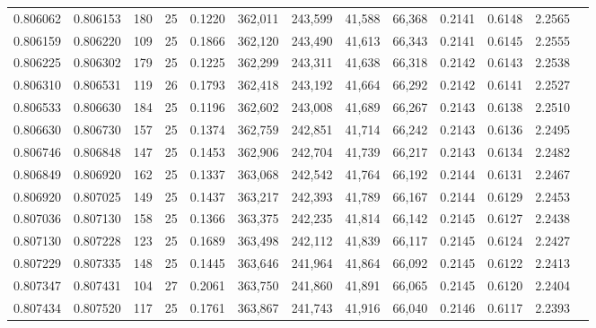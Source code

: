 \begin{tabular}{rrrrrrrrrrrrr}
0.806062 & 0.806153 &   180 &  25 &                                     0.1220 & 362,011 & 243,599 &  41,588 &  66,368 & 0.2141 & 0.6148 & 2.2565 \\
0.806159 & 0.806220 &   109 &  25 &                                     0.1866 & 362,120 & 243,490 &  41,613 &  66,343 & 0.2141 & 0.6145 & 2.2555 \\
0.806225 & 0.806302 &   179 &  25 &                                     0.1225 & 362,299 & 243,311 &  41,638 &  66,318 & 0.2142 & 0.6143 & 2.2538 \\
0.806310 & 0.806531 &   119 &  26 &                                     0.1793 & 362,418 & 243,192 &  41,664 &  66,292 & 0.2142 & 0.6141 & 2.2527 \\
0.806533 & 0.806630 &   184 &  25 &                                     0.1196 & 362,602 & 243,008 &  41,689 &  66,267 & 0.2143 & 0.6138 & 2.2510 \\
0.806630 & 0.806730 &   157 &  25 &                                     0.1374 & 362,759 & 242,851 &  41,714 &  66,242 & 0.2143 & 0.6136 & 2.2495 \\
0.806746 & 0.806848 &   147 &  25 &                                     0.1453 & 362,906 & 242,704 &  41,739 &  66,217 & 0.2143 & 0.6134 & 2.2482 \\
0.806849 & 0.806920 &   162 &  25 &                                     0.1337 & 363,068 & 242,542 &  41,764 &  66,192 & 0.2144 & 0.6131 & 2.2467 \\
0.806920 & 0.807025 &   149 &  25 &                                     0.1437 & 363,217 & 242,393 &  41,789 &  66,167 & 0.2144 & 0.6129 & 2.2453 \\
0.807036 & 0.807130 &   158 &  25 &                                     0.1366 & 363,375 & 242,235 &  41,814 &  66,142 & 0.2145 & 0.6127 & 2.2438 \\
0.807130 & 0.807228 &   123 &  25 &                                     0.1689 & 363,498 & 242,112 &  41,839 &  66,117 & 0.2145 & 0.6124 & 2.2427 \\
0.807229 & 0.807335 &   148 &  25 &                                     0.1445 & 363,646 & 241,964 &  41,864 &  66,092 & 0.2145 & 0.6122 & 2.2413 \\
0.807347 & 0.807431 &   104 &  27 &                                     0.2061 & 363,750 & 241,860 &  41,891 &  66,065 & 0.2145 & 0.6120 & 2.2404 \\
0.807434 & 0.807520 &   117 &  25 &                                     0.1761 & 363,867 & 241,743 &  41,916 &  66,040 & 0.2146 & 0.6117 & 2.2393 \\

\end{tabular}
